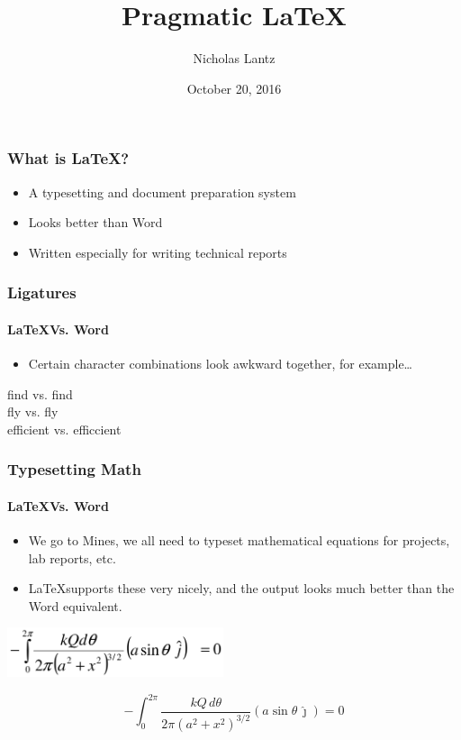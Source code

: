 \documentclass[xetex,mathserif,serif]{beamer}
\title{Pragmatic \LaTeX}
\author{Nicholas Lantz}
\date{October 20, 2016}
\begin{document}
\maketitle

\begin{frame}
    \frametitle{What is \LaTeX?}

    \begin{itemize}
        \item
            A typesetting and document preparation system
        \item
            Looks better than Word
        \item
            Written especially for writing technical reports
    \end{itemize}
\end{frame}

\begin{frame}
    \frametitle{Ligatures}
    \framesubtitle{\LaTeX Vs. Word}

    \begin{itemize}
        \item
            Certain character combinations look awkward together, for
            example\ldots
    \end{itemize}

    \Large
    find vs. {f}ind\\
    fly vs. {f}ly\\
    efficient vs. e{f}{f}{i}ccient
\end{frame}

\begin{frame}
    \frametitle{Typesetting Math}
    \framesubtitle{\LaTeX Vs. Word}

    \begin{itemize}
        \item
            We go to Mines, we all need to typeset mathematical equations for
            projects, lab reports, etc.
        \item
            \LaTeX supports these very nicely, and the output looks much better
            than the Word equivalent.
    \end{itemize}

    \centering
    \includegraphics[width=2.5in]{media/wordmath}

    \begin{displaymath}
        -\int_0^{2 \pi} \frac{kQ\, d\theta}{2\pi{\left(a^2 +
        x^2\right)}^{3/2}} (a \sin \theta \,\hat\jmath) = 0
    \end{displaymath}
\end{frame}
\end{document}
